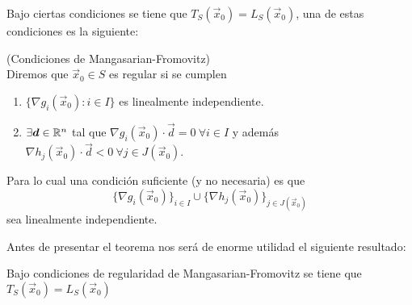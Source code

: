 Bajo ciertas condiciones se tiene que $T_S(\vec{x}_0) = L_S(\vec{x}_0)$, una de estas condiciones es la siguiente:
 
\begin{definicion}{\rm (Condiciones de Mangasarian-Fromovitz)} \label{Condiciones!de Mangazarian-Fromovitz}
\\Diremos que $\vec{x}_0 \in S$ es regular si se cumplen
\begin{enumerate}
\item $\{\nabla g_i(\vec{x}_0) : i\in I\}$ es linealmente independiente.
\item $\exists \boldsymbol{d} \in \mathbb{R}^n$ tal que $\nabla g_i(\vec{x}_0)\cdot \vec{d} = 0 \:\forall  i \in I$ y adem\'as $\nabla h_j(\vec{x}_0)\cdot \vec{d} < 0 \:\forall j \in J(\vec{x}_0)$.
\end{enumerate}
Para lo cual una condici\'on suficiente (y no necesaria) es que
$$\{\nabla g_i(\vec{x}_0)\}_{i \in I} \cup \{\nabla h_j(\vec{x}_0)\}_{j\in J(\vec{x}_0)}$$
sea linealmente independiente.
\end{definicion}

Antes de presentar el teorema nos ser\'a de enorme utilidad el siguiente resultado:

\begin{teorema}\label{teo-MF}
Bajo condiciones de regularidad de Mangasarian-Fromovitz se tiene que $T_S(\vec{x}_0)=L_S(\vec{x}_0)$
\end{teorema}

